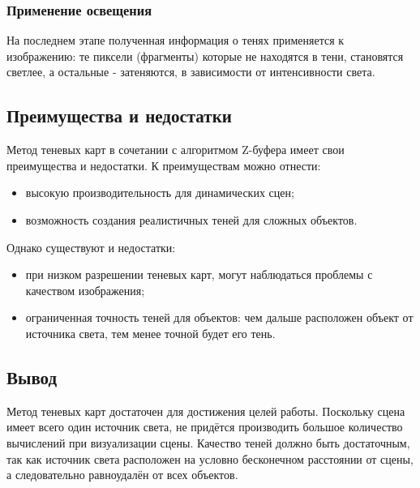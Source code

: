 \subsubsection*{Применение освещения} 

На последнем этапе полученная информация о тенях применяется к изображению: те пиксели (фрагменты) которые не находятся в тени, становятся светлее, а остальные - затеняются, в зависимости от интенсивности света.

\subsection*{Преимущества и недостатки}

Метод теневых карт в сочетании с алгоритмом Z-буфера имеет свои преимущества и недостатки. К преимуществам можно отнести:

\begin{itemize}
    \item высокую производительность для динамических сцен;
    \item возможность создания реалистичных теней для сложных объектов.
\end{itemize}

Однако существуют и недостатки:

\begin{itemize}
    \item при низком разрешении теневых карт, могут наблюдаться проблемы с качеством изображения;
    \item ограниченная точность теней для объектов: чем дальше расположен объект от источника света, тем менее точной будет его тень.
\end{itemize}

\subsection*{Вывод}

Метод теневых карт достаточен для достижения целей работы. Поскольку сцена имеет всего один источник света, не придётся производить большое количество вычислений при визуализации сцены. Качество теней должно быть достаточным, так как источник света расположен на условно бесконечном расстоянии от сцены, а следовательно равноудалён от всех объектов. 
